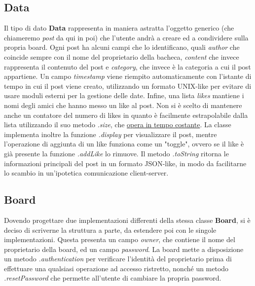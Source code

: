 \documentclass[10pt, italian, openany]{book}
\begin{document}
\subsection{Data}
Il tipo di dato \textbf{Data} rappresenta in maniera astratta l'oggetto generico (che chiameremo \textit{post} da qui in poi) che l'utente andrà a creare ed a condividere sulla propria board. Ogni post ha alcuni campi che lo identificano, quali \textit{author} che coincide sempre con il nome del proprietario della bacheca, \textit{content} che invece rappresenta il contenuto del post e \textit{category}, che invece è la categoria a cui il post appartiene. Un campo \textit{timestamp} viene riempito automaticamente con l'istante di tempo in cui il post viene creato, utilizzando un formato UNIX-like per evitare di usare moduli esterni per la gestione delle date. Infine, una lista \textit{likes} mantiene i nomi degli amici che hanno messo un like al post. Non si è scelto di mantenere anche un contatore del numero di likes in quanto è facilmente estrapolabile dalla lista utilizzando il suo metodo \textit{.size}, che \href{https://docs.oracle.com/javase/6/docs/api/java/util/ArrayList.html}{opera in tempo costante}. La classe implementa inoltre la funzione \textit{.display} per visualizzare il post, mentre l'operazione di aggiunta di un like funziona come un "toggle", ovvero se il like è già presente la funzione \textit{.addLike} lo rimuove. Il metodo \textit{.toString} ritorna le informazioni principali del post in un formato JSON-like, in modo da facilitarne lo scambio in un'ipotetica comunicazione client-server.

\subsection{Board}
Dovendo progettare due implementazioni differenti della stessa classe \textbf{Board}, si è deciso di scriverne la struttura a parte, da estendere poi con le singole implementazioni. Questa presenta un campo \textit{owner}, che contiene il nome del proprietario della board, ed un campo \textit{password}. La board mette a disposizione un metodo \textit{.authentication} per verificare l'identità del proprietario prima di effettuare una qualsiasi operazione ad accesso ristretto, nonché un metodo \textit{.resetPassword} che permette all'utente di cambiare la propria password.
\end{document}
